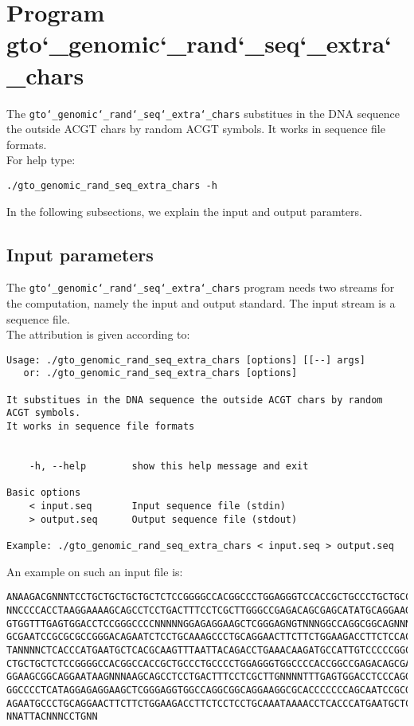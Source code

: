 \section{Program gto\char`_genomic\char`_rand\char`_seq\char`_extra\char`_chars}
The \texttt{gto\char`_genomic\char`_rand\char`_seq\char`_extra\char`_chars} substitues in the DNA sequence the outside ACGT chars by random ACGT symbols. It works in sequence file formats.\\
For help type:
\begin{lstlisting}
./gto_genomic_rand_seq_extra_chars -h
\end{lstlisting}
In the following subsections, we explain the input and output paramters.

\subsection*{Input parameters}

The \texttt{gto\char`_genomic\char`_rand\char`_seq\char`_extra\char`_chars} program needs two streams for the computation,
namely the input and output standard. The input stream is a sequence file.\\
The attribution is given according to:
\begin{lstlisting}
Usage: ./gto_genomic_rand_seq_extra_chars [options] [[--] args]
   or: ./gto_genomic_rand_seq_extra_chars [options]

It substitues in the DNA sequence the outside ACGT chars by random ACGT symbols.
It works in sequence file formats


    -h, --help        show this help message and exit

Basic options
    < input.seq       Input sequence file (stdin)
    > output.seq      Output sequence file (stdout)

Example: ./gto_genomic_rand_seq_extra_chars < input.seq > output.seq
\end{lstlisting}
An example on such an input file is:
\begin{lstlisting}
ANAAGACGNNNTCCTGCTGCTGCTGCTCTCCGGGGCCACGGCCCTGGAGGGTCCACCGCTGCCCTGCTGCCATTGTCCCC
NNCCCCACCTAAGGAAAAGCAGCCTCCTGACTTTCCTCGCTTGGGCCGAGACAGCGAGCATATGCAGGAAGCGGCAGGAA
GTGGTTTGAGTGGACCTCCGGGCCCCNNNNNGGAGAGGAAGCTCGGGAGNGTNNNGGCCAGGCGGCAGNNNNCCAGTGCC
GCGAATCCGCGCGCCGGGACAGAATCTCCTGCAAAGCCCTGCAGGAACTTCTTCTGGAAGACCTTCTCCACCCCCCCAGC
TANNNNCTCACCCATGAATGCTCACGCAAGTTTAATTACAGACCTGAAACAAGATGCCATTGTCCCCCGGCCTCCTGCTG
CTGCTGCTCTCCGGGGCCACGGCCACCGCTGCCCTGCCCCTGGAGGGTGGCCCCACCGGCCGAGACAGCGAGCATATGCA
GGAAGCGGCAGGAATAAGNNNAAGCAGCCTCCTGACTTTCCTCGCTTGNNNNTTTGAGTGGACCTCCCAGGCCAGTGCCG
GGCCCCTCATAGGAGAGGAAGCTCGGGAGGTGGCCAGGCGGCAGGAAGGCGCACCCCCCCAGCAATCCGCGCGCCGGGAC
AGAATGCCCTGCAGGAACTTCTTCTGGAAGACCTTCTCCTCCTGCAAATAAAACCTCACCCATGAATGCTCACGCAAGTT
NNATTACNNNCCTGNN
\end{lstlisting}

